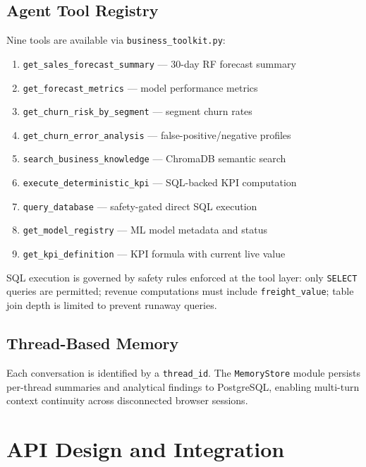 \documentclass[conference]{IEEEtran}
\begin{document}
\subsection{Agent Tool Registry}

Nine tools are available via \texttt{business\_toolkit.py}:

\begin{enumerate}[leftmargin=*,noitemsep,topsep=2pt]
  \item \texttt{get\_sales\_forecast\_summary} — 30-day RF forecast summary
  \item \texttt{get\_forecast\_metrics} — model performance metrics
  \item \texttt{get\_churn\_risk\_by\_segment} — segment churn rates
  \item \texttt{get\_churn\_error\_analysis} — false-positive/negative profiles
  \item \texttt{search\_business\_knowledge} — ChromaDB semantic search
  \item \texttt{execute\_deterministic\_kpi} — SQL-backed KPI computation
  \item \texttt{query\_database} — safety-gated direct SQL execution
  \item \texttt{get\_model\_registry} — ML model metadata and status
  \item \texttt{get\_kpi\_definition} — KPI formula with current live value
\end{enumerate}

SQL execution is governed by safety rules enforced at the tool layer: only \texttt{SELECT}
queries are permitted; revenue computations must include \texttt{freight\_value};
table join depth is limited to prevent runaway queries.

\subsection{Thread-Based Memory}

Each conversation is identified by a \texttt{thread\_id}.  The \texttt{MemoryStore}
module persists per-thread summaries and analytical findings to PostgreSQL, enabling
multi-turn context continuity across disconnected browser sessions.

\section{API Design and Integration}
\end{document}
